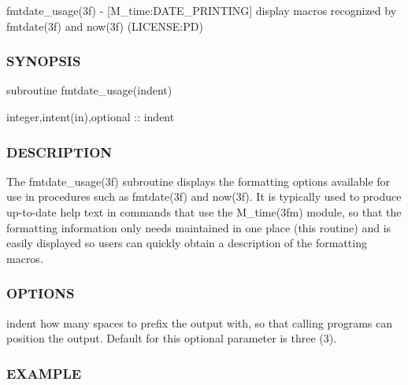 fmtdate\+\_\+usage(3f) -\/ \mbox{[}M\+\_\+time\+:D\+A\+T\+E\+\_\+\+P\+R\+I\+N\+T\+I\+NG\mbox{]} display macros recognized by fmtdate(3f) and now(3f) (L\+I\+C\+E\+N\+SE\+:PD) 

\subsubsection*{S\+Y\+N\+O\+P\+S\+IS}

\begin{DoxyVerb}subroutine fmtdate_usage(indent)

 integer,intent(in),optional      :: indent
\end{DoxyVerb}


\subsubsection*{D\+E\+S\+C\+R\+I\+P\+T\+I\+ON}

\begin{DoxyVerb}The fmtdate_usage(3f) subroutine displays the formatting options
available for use in procedures such as fmtdate(3f) and now(3f).
It is typically used to produce up-to-date help text in commands
that use the M_time(3fm) module, so that the formatting information
only needs maintained in one place (this routine) and is easily
displayed so users can quickly obtain a description of the formatting
macros.
\end{DoxyVerb}


\subsubsection*{O\+P\+T\+I\+O\+NS}

indent how many spaces to prefix the output with, so that calling programs can position the output. Default for this optional parameter is three (3).

\subsubsection*{E\+X\+A\+M\+P\+LE}

